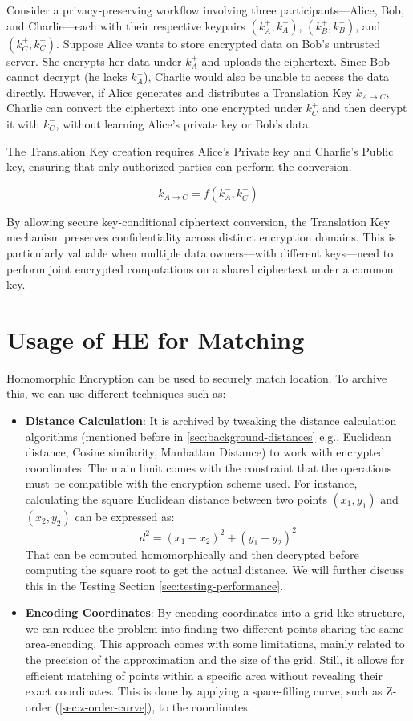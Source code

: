 Consider a privacy‑preserving workflow involving three participants—Alice, Bob, and Charlie—each with their respective keypairs $(k_A^+, k_A^-)$, $(k_B^+, k_B^-)$, and $(k_C^+, k_C^-)$. Suppose Alice wants to store encrypted data on Bob’s untrusted server. She encrypts her data under $k_A^+$ and uploads the ciphertext. Since Bob cannot decrypt (he lacks $k_A^-$), Charlie would also be unable to access the data directly. However, if Alice generates and distributes a Translation Key $k_{A\to C}$, Charlie can convert the ciphertext into one encrypted under $k_C^+$ and then decrypt it with $k_C^-$, without learning Alice’s private key or Bob’s data.

The Translation Key creation requires Alice's Private key and Charlie's Public key, ensuring that only authorized parties can perform the conversion.

\[
    k_{A\to C} = f(k_A^-,k_C^+)
\]

By allowing secure key-conditional ciphertext conversion, the Translation Key mechanism preserves confidentiality across distinct encryption domains. This is particularly valuable when multiple data owners—with different keys—need to perform joint encrypted computations on a shared ciphertext under a common key.


\section{Usage of HE for Matching}
Homomorphic Encryption can be used to securely match location. To archive this, we can use different techniques such as:
\begin{itemize}
    \item \textbf{Distance Calculation}: It is archived by tweaking the distance calculation algorithms (mentioned before in \cref{sec:background-distances} e.g., Euclidean distance, Cosine similarity, Manhattan Distance) to work with encrypted coordinates. The main limit comes with the constraint that the operations must be compatible with the encryption scheme used. For instance, calculating the square Euclidean distance between two points \( (x_1, y_1) \) and \( (x_2, y_2) \) can be expressed as:
    \[
        d^2 = (x_1 - x_2)^2 + (y_1 - y_2)^2
    \]
    That can be computed homomorphically and then decrypted before computing the square root to get the actual distance. We will further discuss this in the Testing Section \ref{sec:testing-performance}.
    \item \textbf{Encoding Coordinates}: By encoding coordinates into a grid-like structure, we can reduce the problem into finding two different points sharing the same area-encoding. This approach comes with some limitations, mainly related to the precision of the approximation and the size of the grid. Still, it allows for efficient matching of points within a specific area without revealing their exact coordinates. This is done by applying a space-filling curve, such as Z-order (\cref{sec:z-order-curve}), to the coordinates.
\end{itemize}

